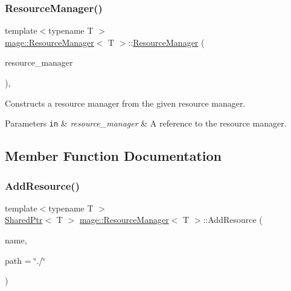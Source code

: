 \subsubsection{\texorpdfstring{Resource\+Manager()}{ResourceManager()}\hspace{0.1cm}{\footnotesize\ttfamily [2/2]}}
{\footnotesize\ttfamily template$<$typename T $>$ \\
\hyperlink{classmage_1_1_resource_manager}{mage\+::\+Resource\+Manager}$<$ T $>$\+::\hyperlink{classmage_1_1_resource_manager}{Resource\+Manager} (\begin{DoxyParamCaption}\item[{const \hyperlink{classmage_1_1_resource_manager}{Resource\+Manager}$<$ T $>$ \&}]{resource\+\_\+manager }\end{DoxyParamCaption})\hspace{0.3cm}{\ttfamily [private]}, {\ttfamily [delete]}}

Constructs a resource manager from the given resource manager.


\begin{DoxyParams}[1]{Parameters}
\mbox{\tt in}  & {\em resource\+\_\+manager} & A reference to the resource manager. \\
\hline
\end{DoxyParams}


\subsection{Member Function Documentation}
\hypertarget{classmage_1_1_resource_manager_a97e20a40abfebc7709ddd51d78f991b9}{}\label{classmage_1_1_resource_manager_a97e20a40abfebc7709ddd51d78f991b9} 
\subsubsection{\texorpdfstring{Add\+Resource()}{AddResource()}}
{\footnotesize\ttfamily template$<$typename T $>$ \\
\hyperlink{namespacemage_a1e01ae66713838a7a67d30e44c67703e}{Shared\+Ptr}$<$ T $>$ \hyperlink{classmage_1_1_resource_manager}{mage\+::\+Resource\+Manager}$<$ T $>$\+::Add\+Resource (\begin{DoxyParamCaption}\item[{const wstring \&}]{name,  }\item[{const wstring \&}]{path = {\ttfamily \char`\"{}./\char`\"{}} }\end{DoxyParamCaption})}

